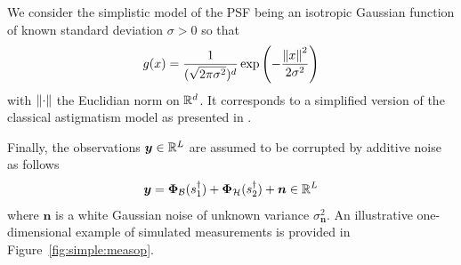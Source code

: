 \documentclass[12pt]{article}
\begin{document}
            We consider the simplistic model of the PSF being an isotropic Gaussian function of known standard deviation $\sigma > 0$ so that
            \begin{equation}
                \label{eq:psf}
                g(x) = \frac{1}{(\sqrt{2\pi\sigma^2})^d} \exp\left({-\frac{\left\lVert x\right\rVert^2}{2 \sigma^2}}\right)
            \end{equation}
            with $\left\lVert\cdot\right\rVert$ the Euclidian norm on $\mathbb{R}^d$. It corresponds to a simplified version of the classical astigmatism model as presented in \cite{huang2017super,denoyelle2019sliding}.
            
            Finally, the observations $\bm{y} \in \mathbb{R}^{L}$ are assumed to be corrupted by additive noise as follows
            \begin{equation}
                \label{eq:ip-bis}
                \bm{y} = \bm{\Phi}_\mathcal{B}(s_1^\dagger) + \bm{\Phi}_\mathcal{H}(s_2^\dagger) + \bm{n} \in \mathbb{R}^L
            \end{equation}
            where $\bm{n}$ is a white Gaussian noise of unknown variance $\sigma_{\bm{n}}^2$.
            An illustrative one-dimensional example of simulated measurements is provided in Figure~\ref{fig:simple:measop}.


        
\end{document}
